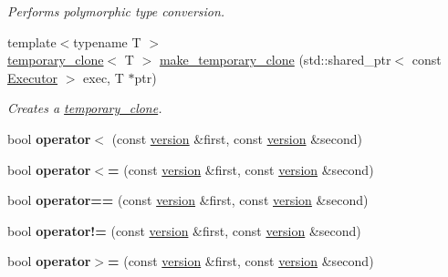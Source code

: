 \begin{DoxyCompactItemize}
\begin{DoxyCompactList}\small\item\em Performs polymorphic type conversion. \end{DoxyCompactList}\item 
{\footnotesize template$<$typename T $>$ }\\\hyperlink{classgko_1_1temporary__clone}{temporary\+\_\+clone}$<$ T $>$ \hyperlink{namespacegko_aa9c0782fb35cc18cb404716d9b6f2c0e}{make\+\_\+temporary\+\_\+clone} (std\+::shared\+\_\+ptr$<$ const \hyperlink{classgko_1_1Executor}{Executor} $>$ exec, T $\ast$ptr)
\begin{DoxyCompactList}\small\item\em Creates a \hyperlink{classgko_1_1temporary__clone}{temporary\+\_\+clone}. \end{DoxyCompactList}\item 
\mbox{\label{namespacegko_a70e5d651d3fc23e6ed48980efd2098d3}} 
bool {\bfseries operator$<$} (const \hyperlink{structgko_1_1version}{version} \&first, const \hyperlink{structgko_1_1version}{version} \&second)
\item 
\mbox{\label{namespacegko_aa3a749f76b73c3b0e161e2019ad12308}} 
bool {\bfseries operator$<$=} (const \hyperlink{structgko_1_1version}{version} \&first, const \hyperlink{structgko_1_1version}{version} \&second)
\item 
\mbox{\label{namespacegko_aeeaafa7179e5dbc1f1c02197598664fb}} 
bool {\bfseries operator==} (const \hyperlink{structgko_1_1version}{version} \&first, const \hyperlink{structgko_1_1version}{version} \&second)
\item 
\mbox{\label{namespacegko_af2d150bb18c9fbdc62c2a02315bd908b}} 
bool {\bfseries operator!=} (const \hyperlink{structgko_1_1version}{version} \&first, const \hyperlink{structgko_1_1version}{version} \&second)
\item 
\mbox{\label{namespacegko_ac033cb13ef2c4d291a894f26d2c64862}} 
bool {\bfseries operator$>$=} (const \hyperlink{structgko_1_1version}{version} \&first, const \hyperlink{structgko_1_1version}{version} \&second)
\item 
\mbox{\label{namespacegko_aa6724904a78b5293c610d113e3b23682}} 

\end{DoxyCompactItemize}
